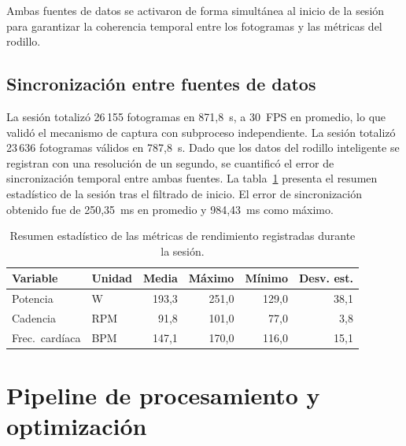 Ambas fuentes de datos se activaron de forma simultánea al inicio de la
sesión para garantizar la coherencia temporal entre los fotogramas y las
métricas del rodillo.

\subsection{Sincronización entre fuentes de datos}
\label{ssec:sincronizacion}

La sesión totalizó 26\,155 fotogramas en 871{,}8~s, a 30~FPS en promedio,
lo que validó el mecanismo de captura con subproceso independiente. La sesión
totalizó 23\,636 fotogramas válidos en 787{,}8~s. Dado que los datos del rodillo
inteligente se registran con una resolución de un segundo, se cuantificó el
error de sincronización temporal entre ambas fuentes. La
tabla~\ref{tab:resumen_sesion} presenta el resumen estadístico de la sesión
tras el filtrado de inicio. El error de sincronización obtenido fue de
250{,}35~ms en promedio y 984{,}43~ms como máximo.

\begin{table}[H]
      \caption{Resumen estadístico de las métricas de rendimiento registradas
            durante la sesión.}
      \label{tab:resumen_sesion}
      \centering
      \small
      \begin{tabular}{llrrrr}
            \toprule
            \textbf{Variable}  & \textbf{Unidad} & \textbf{Media} &
            \textbf{Máximo} & \textbf{Mínimo} & \textbf{Desv. est.} \\
            \midrule
            Potencia           & W    & 193{,}3 & 251{,}0 & 129{,}0 & 38{,}1  \\
            Cadencia           & RPM  & 91{,}8  & 101{,}0 & 77{,}0  & 3{,}8   \\
            Frec.\ cardíaca    & BPM  & 147{,}1 & 170{,}0 & 116{,}0 & 15{,}1  \\
            \bottomrule
      \end{tabular}
\end{table}

\section{Pipeline de procesamiento y optimización}
\label{sec:pipeline}

